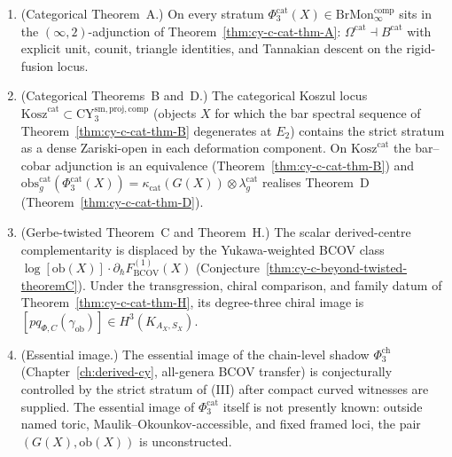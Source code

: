 \begin{theorem}
\begin{enumerate}[label=\textup{(\Roman*)}]
 \emph{Abelian:} $\Phi_3^{\mathrm{cat}}(A)$ is computed by the
 K\"unneth formula on $A \simeq E_1 \times E_2 \times E_3$ with
 $E_\infty$-collapse at $d = 1$
 (Theorem~\ref{thm:phi-platonic}\textup{(U3)}).
 \item \textup{(Categorical Theorem~A.)} On every stratum
 $\Phi_3^{\mathrm{cat}}(X) \in \mathrm{BrMon}^{\mathrm{comp}}_\infty$
 sits in the $(\infty,2)$-adjunction of Theorem~\ref{thm:cy-c-cat-thm-A}:
 $\Omega^{\mathrm{cat}} \dashv B^{\mathrm{cat}}$ with explicit unit,
 counit, triangle identities, and Tannakian descent on the rigid-fusion
 locus.
 \item \textup{(Categorical Theorems~B and~D.)} The categorical Koszul
 locus $\mathrm{Kosz}^{\mathrm{cat}} \subset \mathrm{CY}_3^{\mathrm{sm,proj,comp}}$
 (objects $X$ for which the bar spectral sequence of
 Theorem~\ref{thm:cy-c-cat-thm-B} degenerates at $E_2$) contains the
 strict stratum as a dense Zariski-open in each deformation component.
 On $\mathrm{Kosz}^{\mathrm{cat}}$ the bar--cobar adjunction is an
 equivalence (Theorem~\ref{thm:cy-c-cat-thm-B}) and
 $\mathrm{obs}_g^{\mathrm{cat}}(\Phi_3^{\mathrm{cat}}(X))
 = \kappa_{\mathrm{cat}}(G(X)) \otimes \lambda_g^{\mathrm{cat}}$
 realises Theorem~D (Theorem~\ref{thm:cy-c-cat-thm-D}).
 \item \textup{(Gerbe-twisted Theorem~C and Theorem~H.)}
 The scalar derived-centre complementarity is displaced by the
 Yukawa-weighted BCOV class
 $\log[\mathrm{ob}(X)] \cdot \partial_\hbar F^{(1)}_{\mathrm{BCOV}}(X)$
 (Conjecture~\ref{thm:cy-c-beyond-twisted-theoremC}).  Under the
 transgression, chiral comparison, and family datum of
 Theorem~\ref{thm:cy-c-cat-thm-H}, its degree-three chiral image is
 $[p q_{\Phi,C}(\gamma_{\mathrm{ob}})]\in H^3(K_{A_X,S_X})$.
 \item \textup{(Essential image.)} The essential image of the
 chain-level shadow $\Phi_3^{\mathrm{ch}}$ (Chapter~\ref{ch:derived-cy},
 all-genera BCOV transfer) is conjecturally controlled by the strict
 stratum of \textup{(III)} after compact curved witnesses are supplied.
 The essential image of $\Phi_3^{\mathrm{cat}}$ itself is not presently
 known: outside named toric, Maulik--Okounkov-accessible, and fixed
 framed loci, the pair $(G(X), \mathrm{ob}(X))$ is unconstructed.
\end{enumerate}
\end{theorem}

